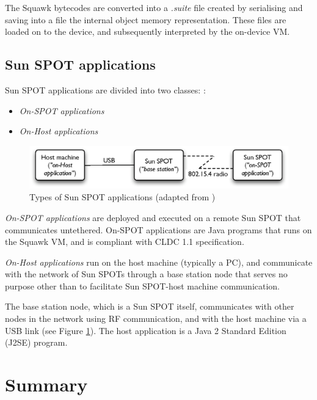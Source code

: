 The Squawk bytecodes are converted into a \emph{.suite} file created by
serialising and saving into a file the internal object memory representation.
These files are loaded on to the device, and subsequently interpreted by the
on-device VM.

\subsection{Sun SPOT applications} \label{subsec:sunspotapps}

Sun SPOT applications are divided into two classes:
\cite{sun_developer:2008}:

\begin{itemize}
  \item \emph{On-SPOT applications}
  \item \emph{On-Host applications}
\end{itemize}

\begin{figure}[h]
\centering
\includegraphics[width=\textwidth]{img/SunSPOTS_applications.eps} 
\caption[Types of Sun SPOT applications]{Types of Sun SPOT applications (adapted from
\cite{sun_developer:2008})}
\label{Fig:SunSPOTS_applications}
\end{figure}  

\emph{On-SPOT applications}  are deployed and
executed on a remote Sun SPOT that communicates untethered. On-SPOT
applications are Java programs that runs on the Squawk VM, and is compliant
with CLDC 1.1 specification. 

\emph{On-Host applications} run on the host machine
(typically a PC), and communicate with the network of Sun SPOTs through a base
station node that serves no purpose other than to facilitate Sun SPOT-host
machine communication. 
  
The base station node, which is a Sun SPOT itself, communicates with other
nodes in the network using RF communication, and with the host machine via a
USB link (see Figure \ref{Fig:SunSPOTS_applications}). The host application is
a Java 2 Standard Edition (J2SE) program.
  
 
\section{Summary}

